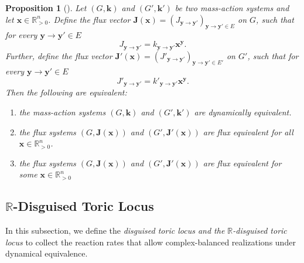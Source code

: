 \documentclass[11pt]{article}
\theoremstyle{plain}
\newtheorem{proposition}[theorem]{Proposition}
\theoremstyle{definition}
\theoremstyle{remark}
\newcommand\RR{\mathbb{R}}
\newcommand\by{\boldsymbol{y}}
\newcommand\bk{\boldsymbol{k}}
\newcommand\bx{\boldsymbol{x}}
\newcommand\bJ{\boldsymbol{J}}
\begin{document}
\begin{proposition}[\cite{craciun2020efficient}]
\label{prop:craciun2020efficient}
Let $(G, \bk)$ and $(G', \bk')$ be two mass-action systems and let $\bx \in \RR_{>0}^n$. Define the flux vector $\bJ (\bx) = (J_{\by \to \by'})_{\by \to \by' \in E}$ on $G$, such that for every $\by \to \by' \in E$
\begin{equation}
J_{\by \to \by'} = k_{\by \to \by'} \bx^{\by}.
\end{equation}
Further, define the flux vector $\bJ' (\bx) = (J'_{\by \to \by'})_{\by \to \by' \in E'}$ on $G'$, such that for every $\by \to \by' \in E$
\begin{equation}
J'_{\by \to \by'} = k'_{\by \to \by'} \bx^{\by}.
\end{equation} 
Then the following are equivalent:
\begin{enumerate}

\item[(a)] the mass-action systems $(G, \bk)$ and $(G', \bk')$ are dynamically equivalent.

\item[(b)] the flux systems $(G, \bJ(\bx))$ and $(G', \bJ'(\bx))$ are flux equivalent for all $\bx \in \RR_{>0}^n$.

\item[(c)] the flux systems $(G, \bJ(\bx))$ and $(G', \bJ'(\bx))$ are flux equivalent for some $\bx \in \RR_{>0}^n$
\end{enumerate}
\end{proposition}



\subsection{\texorpdfstring{$\RR$}{R}-Disguised Toric Locus}
\label{sec:disguised_locus}

In this subsection, we define the \emph{disguised toric locus and the $\RR$-disguised toric locus} to collect the reaction rates that allow complex-balanced realizations under dynamical equivalence.
\end{document}
